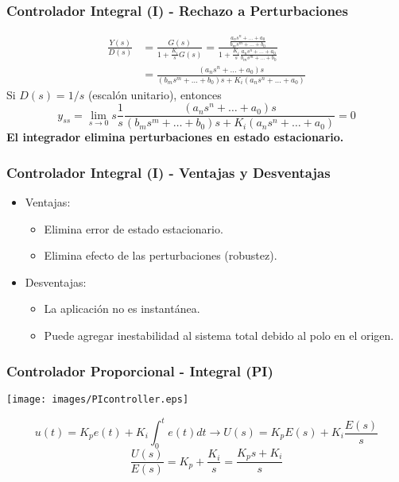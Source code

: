 \documentclass[aspectratio=169,handout]{beamer}
\theoremstyle{definition}
\theoremstyle{plain}
\theoremstyle{remark}
\begin{document}
\begin{frame}[<+->]\frametitle{Controlador Integral (I) - Rechazo a Perturbaciones}
\begin{align*}
  \frac{Y(s)}{D(s)} &= \frac{G(s)}{1+\frac{K_i}{s}G(s)} = \frac{\frac{a_n s^n + \dots + a_0}{b_m s^m + \dots + b_0}}{1 + \frac{K_i}{s}\frac{a_n s^n + \dots + a_0}{b_m s^m + \dots + b_0}}\\
  &= \frac{(a_n s^n + \dots + a_0)s}{(b_m s^m + \dots + b_0)s + K_i(a_n s^n + \dots + a_0)} 
\end{align*}
\pause
Si $D(s) = 1/s$ (escalón unitario), entonces
\begin{equation*}
  y_{ss} = \lim_{s \rightarrow 0} s \frac{1}{s} \frac{(a_n s^n + \dots + a_0)s}{(b_m s^m + \dots + b_0)s + K_i(a_n s^n + \dots + a_0)} = 0
\end{equation*}
\pause
\textbf{El integrador elimina perturbaciones en estado estacionario.}
\end{frame}

\begin{frame}[<+->]\frametitle{Controlador Integral (I) - Ventajas y Desventajas}
  \begin{itemize}
    \item Ventajas:
    \begin{itemize}
      \item Elimina error de estado estacionario.
      \item Elimina efecto de las perturbaciones (robustez).
    \end{itemize}
    \item Desventajas:
    \begin{itemize}
      \item La aplicación no es instantánea.
      \item Puede agregar inestabilidad al sistema total debido al polo en el origen.
    \end{itemize}
  \end{itemize}
\end{frame}

\begin{frame}[<+->]\frametitle{Controlador Proporcional - Integral (PI)}
\begin{center}
  \texttt{[image: images/PIcontroller.eps]}
\end{center}
\pause
\begin{equation*}
  u(t) = K_p e(t) + K_i \int_0^t e(t) dt \longrightarrow U(s) = K_p E(s) + K_i \frac{E(s)}{s}
\end{equation*}
\pause
\begin{equation*}
  \frac{U(s)}{E(s)} = K_p + \frac{K_i}{s} = \frac{K_p s + K_i}{s}
\end{equation*}
\end{frame}
\end{document}
